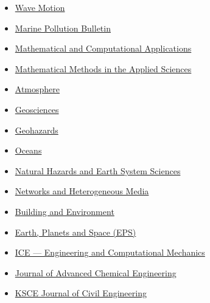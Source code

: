 \documentclass[final, a4paper, oneside, 12pt]{article}
\numberwithin{equation}{section}
\begin{document}
\begin{itemize}
    \item \href{http://www.elsevier.com/locate/wavemoti}%
    {Wave Motion}

    \item \href{https://www.sciencedirect.com/journal/marine-pollution-bulletin/}{Marine Pollution Bulletin}
    
    \item \href{https://www.mdpi.com/journal/mca}{Mathematical and Computational Applications}
    
    \item \href{https://onlinelibrary.wiley.com/journal/10991476/}{Mathematical Methods in the Applied Sciences}

    \item \href{https://www.mdpi.com/journal/atmosphere/}{Atmosphere}
    
    \item \href{https://www.mdpi.com/journal/geosciences/}{Geosciences}

    \item \href{https://www.mdpi.com/journal/geohazards/}{Geohazards}

    \item \href{https://www.mdpi.com/journal/oceans/}{Oceans}
    
    \item \href{http://www.nat-hazards-earth-syst-sci.net/}%
    {Natural Hazards and Earth System Sciences}

    \item \href{https://www.aimspress.com/journal/nhm/}{Networks and Heterogeneous Media}

    \item \href{https://www.sciencedirect.com/journal/building-and-environment}%
    {Building and Environment}
    
    \item \href{http://www.terrapub.co.jp/journals/EPS/}{Earth, Planets and Space (EPS)}
    
    \item \href{http://www.icevirtuallibrary.com/content/serial/eacm/}{ICE --- Engineering and Computational Mechanics}
    
    \item \href{http://www.ashdin.com/journals/jace/jace.aspx}{Journal of Advanced Chemical Engineering}
    
    \item \href{http://www.springer.com/engineering/civil+engineering/journal/12205}{KSCE Journal of Civil Engineering}
    

\end{itemize}
\end{document}
